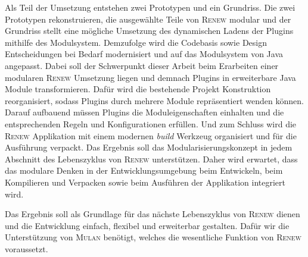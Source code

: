 	Als Teil der Umsetzung entstehen zwei Prototypen und ein Grundriss. Die zwei Prototypen rekonstruieren, die ausgewählte Teile von \textsc{Renew} modular und der Grundriss stellt eine mögliche Umsetzung des dynamischen Ladens der Plugins mithilfe des Modulsystem. Demzufolge wird die Codebasis sowie Design Entscheidungen bei Bedarf modernisiert und auf das Modulsystem von Java angepasst. Dabei soll der Schwerpunkt dieser Arbeit beim Erarbeiten einer modularen \textsc{Renew} Umsetzung liegen und demnach Plugins in erweiterbare Java Module transformieren.\newline
	Dafür wird die bestehende Projekt Konstruktion reorganisiert, sodass Plugins durch mehrere Module repräsentiert wenden können. Darauf aufbauend müssen Plugins die Moduleigenschaften einhalten und die entsprechenden Regeln und Konfigurationen erfüllen. Und zum Schluss wird die \textsc{Renew} Applikation mit einem modernen \textit{build} Werkzeug organisiert und für die Ausführung verpackt.\newline
	Das Ergebnis soll das Modularisierungskonzept in jedem Abschnitt des Lebenszyklus von \textsc{Renew} unterstützen. Daher wird erwartet, dass das modulare Denken in der Entwicklungsumgebung beim Entwickeln, beim Kompilieren und Verpacken sowie beim Ausführen der Applikation integriert wird. \bigbreak

	Das Ergebnis soll als Grundlage für das nächste Lebenszyklus von \textsc{Renew} dienen und die Entwicklung einfach, flexibel und erweiterbar gestalten. Dafür wir die Unterstützung von \textsc{Mulan} benötigt, welches die wesentliche Funktion von \textsc{Renew} voraussetzt. 
